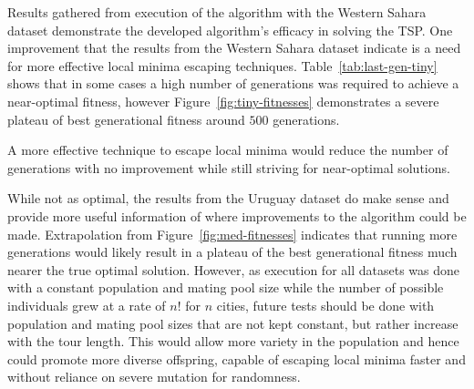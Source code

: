 Results gathered from execution of the algorithm with the Western Sahara
dataset demonstrate the developed algorithm's efficacy in solving
the TSP. One improvement that the results from the Western Sahara
dataset indicate is a need for more effective local minima escaping 
techniques. Table~\ref{tab:last-gen-tiny} shows that in some cases
a high number of generations was required to achieve a near-optimal 
fitness, however Figure~\ref{fig:tiny-fitnesses} demonstrates a severe
plateau of best generational fitness around $500$ generations.

A more effective technique to escape local minima would reduce the 
number of generations with no improvement while still striving for 
near-optimal solutions.

While not as optimal, the results from the Uruguay dataset
do make sense and provide more useful information of where improvements
to the algorithm could be made. Extrapolation from 
Figure~\ref{fig:med-fitnesses} indicates that running more generations would likely 
result in a plateau of the best generational fitness much nearer the true
optimal solution. However, as execution for all datasets was done with
a constant population and mating pool size while the number of 
possible individuals grew at a rate of $n!$ for $n$ cities, future 
tests should be done with population and mating pool sizes that are not 
kept constant, but rather increase with the tour length. This would allow 
more variety in the population and hence could promote more diverse 
offspring, capable of escaping local minima faster and without 
reliance on severe mutation for randomness.